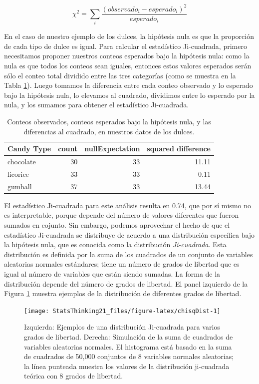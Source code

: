 \documentclass[
  12pt,
]{book}
\begin{document}
\[
\chi^2 = \sum_i\frac{(observado_i - esperado_i)^2}{esperado_i}
\]

En el caso de nuestro ejemplo de los dulces, la hipótesis nula es que la proporción de cada tipo de dulce es igual. Para calcular el estadístico Ji-cuadrada, primero necesitamos proponer nuestros conteos esperados bajo la hipótesis nula: como la nula es que todos los conteos sean iguales, entonces estos valores esperados serán sólo el conteo total dividido entre las tres categorías (como se muestra en la Tabla \ref{tab:candyDf}). Luego tomamos la diferencia entre cada conteo observado y lo esperado bajo la hipótesis nula, lo elevamos al cuadrado, dividimos entre lo esperado por la nula, y los sumamos para obtener el estadístico Ji-cuadrada.

\begin{table}

\caption{\label{tab:candyDf}Conteos observados, conteos esperados bajo la hipótesis nula, y las diferencias al cuadrado, en nuestros datos de los dulces.}
\centering
\begin{tabular}[t]{l|r|r|r}
\hline
Candy Type & count & nullExpectation & squared difference\\
\hline
chocolate & 30 & 33 & 11.11\\
\hline
licorice & 33 & 33 & 0.11\\
\hline
gumball & 37 & 33 & 13.44\\
\hline
\end{tabular}
\end{table}

El estadístico Ji-cuadrada para este análisis resulta en 0.74, que por sí mismo no es interpretable, porque depende del número de valores diferentes que fueron sumados en cojunto. Sin embargo, podemos aprovechar el hecho de que el estadístico Ji-cuadrada se distribuye de acuerdo a una distribución específica bajo la hipótesis nula, que es conocida como la distribución \emph{Ji-cuadrada}. Esta distribución es definida por la suma de los cuadrados de un conjunto de variables aleatorias normales estándares; tiene un número de grados de libertad que es igual al número de variables que están siendo sumadas. La forma de la distribución depende del número de grados de libertad. El panel izquierdo de la Figura \ref{fig:chisqDist} muestra ejemplos de la distribución de diferentes grados de libertad.

\begin{figure}
\texttt{[image: StatsThinking21\_files/figure-latex/chisqDist-1]} \caption{Izquierda: Ejemplos de una distribución Ji-cuadrada para varios grados de libertad. Derecha: Simulación de la suma de cuadrados de variables aleatorias normales. El histograma está basado en la suma de cuadrados de 50,000 conjuntos de 8 variables normales aleatorias; la línea punteada muestra los valores de la distribución ji-cuadrada teórica con 8 grados de libertad.}\label{fig:chisqDist}
\end{figure}
\end{document}
